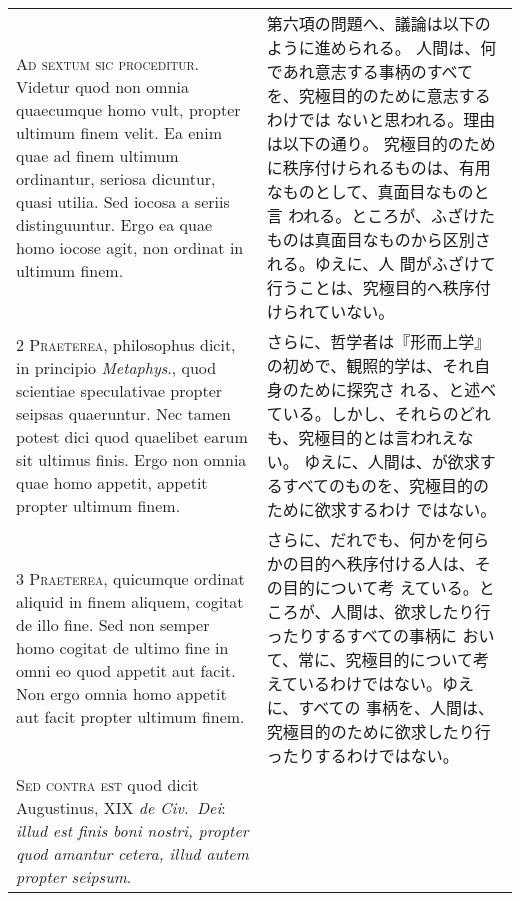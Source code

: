 \documentclass[10pt]{jsarticle} %
\begin{document}
\begin{longtable}{p{21em}p{21em}}

{\Huge A}{\scshape d sextum sic proceditur}. Videtur quod
non omnia quaecumque homo vult, propter ultimum finem velit. Ea enim
quae ad finem ultimum ordinantur, seriosa dicuntur, quasi utilia. Sed
iocosa a seriis distinguuntur. Ergo ea quae homo iocose agit, non
ordinat in ultimum finem.


&

第六項の問題へ、議論は以下のように進められる。
人間は、何であれ意志する事柄のすべてを、究極目的のために意志するわけでは
 ないと思われる。理由は以下の通り。
究極目的のために秩序付けられるものは、有用なものとして、真面目なものと言
 われる。ところが、ふざけたものは真面目なものから区別される。ゆえに、人
 間がふざけて行うことは、究極目的へ秩序付けられていない。

\\


{\scshape 2 Praeterea}, philosophus dicit, in
principio {\itshape Metaphys}., quod scientiae speculativae propter seipsas
quaeruntur. Nec tamen potest dici quod quaelibet earum sit ultimus
finis. Ergo non omnia quae homo appetit, appetit propter ultimum finem.


&

さらに、哲学者は『形而上学』の初めで、観照的学は、それ自身のために探究さ
 れる、と述べている。しかし、それらのどれも、究極目的とは言われえない。
 ゆえに、人間は、が欲求するすべてのものを、究極目的のために欲求するわけ
 ではない。

\\


{\scshape 3 Praeterea}, quicumque ordinat aliquid in
finem aliquem, cogitat de illo fine. Sed non semper homo cogitat de
ultimo fine in omni eo quod appetit aut facit. Non ergo omnia homo
appetit aut facit propter ultimum finem.


&


さらに、だれでも、何かを何らかの目的へ秩序付ける人は、その目的について考
 えている。ところが、人間は、欲求したり行ったりするすべての事柄に
 おいて、常に、究極目的について考えているわけではない。ゆえに、すべての
 事柄を、人間は、究極目的のために欲求したり行ったりするわけではない。

\\


{\scshape Sed contra est} quod dicit Augustinus,
XIX {\itshape de Civ.~Dei}: {\itshape illud est finis boni nostri, propter quod amantur
cetera, illud autem propter seipsum}.



\end{longtable}
\end{document}
